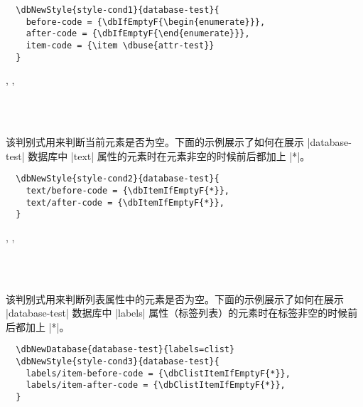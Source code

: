 \documentclass[full]{l3doc}
\begin{document}
\begin{documentation}
\begin{verbatim}
  \dbNewStyle{style-cond1}{database-test}{
    before-code = {\dbIfEmptyF{\begin{enumerate}}},
    after-code = {\dbIfEmptyF{\end{enumerate}}},
    item-code = {\item \dbuse{attr-test}}
  }
\end{verbatim}

\begin{function}{\dbItemIfEmptyT, \dbItemIfEmptyF, \dbItemIfEmptyTF}
  \begin{syntax}
       \\
      \\
     
  \end{syntax}

  该判别式用来判断当前元素是否为空。下面的示例展示了如何在展示 |database-test|
  数据库中 |text| 属性的元素时在元素非空的时候前后都加上 |*|。
\end{function}

\begin{verbatim}
  \dbNewStyle{style-cond2}{database-test}{
    text/before-code = {\dbItemIfEmptyF{*}},
    text/after-code = {\dbItemIfEmptyF{*}},
  }
\end{verbatim}

\begin{function}{\dbClistItemIfEmptyT, \dbClistItemIfEmptyF, \dbClistItemIfEmptyTF}
  \begin{syntax}
       \\
      \\
     
  \end{syntax}

  该判别式用来判断列表属性中的元素是否为空。下面的示例展示了如何在展示
  |database-test| 数据库中 |labels| 属性（标签列表）的元素时在标签非空的时候前
  后都加上 |*|。
\end{function}

\begin{verbatim}
  \dbNewDatabase{database-test}{labels=clist}
  \dbNewStyle{style-cond3}{database-test}{
    labels/item-before-code = {\dbClistItemIfEmptyF{*}},
    labels/item-after-code = {\dbClistItemIfEmptyF{*}},
  }
\end{verbatim}


\end{documentation}
\end{document}
